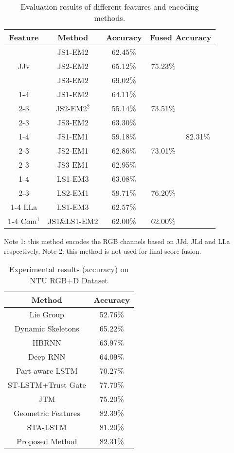\documentclass[5pt]{article}
\begin{document}
		\begin{table}[!t]
			\centering
			\caption{Evaluation results of different features and encoding methods. }
			\label{tab:result_all}
			\begin{tabular}{|c|c|c|c|c|}
				\hline Feature & Method & Accuracy &\multicolumn{2}{c|}{Fused Accuracy}\\
				\hline \multirow{3}{*}{JJv}& JS1-EM2&62.45\%&\multirow{3}{1cm}{75.23\%}& \multirow{13}{*}{82.31\%}\\
				\cline{2-3}& JS2-EM2 &65.12\% &&\\
				\cline{2-3}& JS3-EM2 &69.02\%&&\\
				\cline{1-4} \multirow{3}{*}{JJo}& JS1-EM2& 64.11\%&\multirow{3}{1cm}{73.51\%}&\\
				\cline{2-3}&JS2-EM2$^2$ & 55.14\%&&\\
				\cline{2-3}& JS3-EM2& 63.30\%&&\\
				\cline{1-4} \multirow{3}{*}{JJd}& JS1-EM1& 59.18\%&\multirow{3}{1cm}{73.01\%}&\\
				\cline{2-3}& JS2-EM1& 62.86\%&&\\
				\cline{2-3}& JS3-EM1& 62.95\%&&\\
				\cline{1-4} \multirow{2}{*}{JLd}& LS1-EM3& 63.08\%&\multirow{3}{1cm}{76.20\%}&\\
				\cline{2-3}& LS2-EM1& 59.71\% &&\\
				\cline{1-4} LLa & LS1-EM3& 62.57\%&62.57\%&\\
				\cline{1-4} Com$^1$ & JS1\&LS1-EM2 &62.00\% &62.00\%&\\
				\hline
			\end{tabular}
			{\flushleft \footnotesize  Note 1: this method encodes the RGB channels based on JJd, JLd and LLa respectively. 
				Note 2: this method is not used for final score fusion. }
		\end{table}	
		
			\begin{table}[!t]
				\centering
				\caption{Experimental results (accuracy) on NTU RGB+D Dataset}
				\label{tab:ntu_result}
				\begin{tabular}{|c|c|}
					\hline Method & Accuracy \\
					\hline Lie Group\cite{Vemulapalli2014} & 52.76\% \\
					Dynamic Skeletons\cite{Ohn-Bar2013} & 65.22\% \\
					HBRNN\cite{Du2015} & 63.97\% \\
					Deep RNN\cite{Shahroudy2016} & 64.09\% \\
					Part-aware LSTM\cite{Shahroudy2016} & 70.27\% \\
					ST-LSTM+Trust Gate\cite{Liu2016} & 77.70\% \\
					JTM\cite{Wang2016} & 75.20\% \\
					Geometric Features\cite{Zhang2017} & 82.39\% \\
					STA-LSTM\cite{Song2017}	& 81.20\%\\
					\hline
					Proposed Method & 82.31\% \\
					\hline
				\end{tabular}
			\end{table}
			
\end{document}
